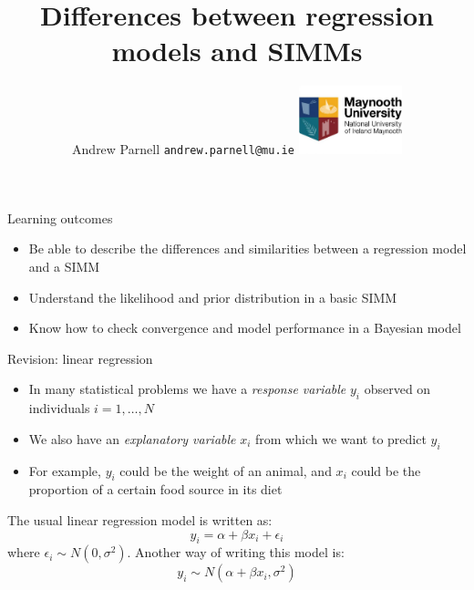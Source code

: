 \documentclass[
  ignorenonframetext,
  aspectratio=169]{beamer}
\title{Differences between regression models and SIMMs}
\author{Andrew Parnell \newline \texttt{andrew.parnell@mu.ie}
\newline \vspace{1cm}
\newline \includegraphics[width=3cm]{../maynooth_uni_logo.jpg}}
\date{}
\providecommand{\tightlist}{%
  \setlength{\itemsep}{0pt}\setlength{\parskip}{0pt}}
\begin{document}
\frame{\titlepage}

\begin{frame}{Learning outcomes}
\protect\hypertarget{learning-outcomes}{}
\begin{itemize}
\tightlist
\item
  Be able to describe the differences and similarities between a
  regression model and a SIMM
\item
  Understand the likelihood and prior distribution in a basic SIMM
\item
  Know how to check convergence and model performance in a Bayesian
  model
\end{itemize}
\end{frame}

\begin{frame}{Revision: linear regression}
\protect\hypertarget{revision-linear-regression}{}
\begin{itemize}
\tightlist
\item
  In many statistical problems we have a \emph{response variable}
  \(y_i\) observed on individuals \(i=1,\ldots,N\)
\item
  We also have an \emph{explanatory variable} \(x_i\) from which we want
  to predict \(y_i\)
\item
  For example, \(y_i\) could be the weight of an animal, and \(x_i\)
  could be the proportion of a certain food source in its diet
\end{itemize}

The usual linear regression model is written as:
\[y_i = \alpha + \beta x_i + \epsilon_i\] where
\(\epsilon_i \sim N(0,\sigma^2)\). Another way of writing this model is:
\[y_i \sim N(\alpha + \beta x_i, \sigma^2)\]
\end{frame}
\end{document}
